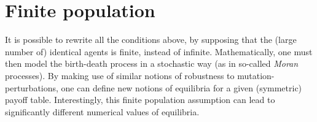 \section{Finite population}
It is possible to rewrite all the conditions above, by supposing that the (large number of) identical agents is finite, instead of infinite.  Mathematically, one must then model the birth-death process in a stochastic way (as in so-called \emph{Moran} processes). By making use of similar notions of robustness to mutation-perturbations, one can define new notions of equilibria for a given (symmetric) payoff table.
Interestingly, this finite population assumption can lead to significantly different numerical values of equilibria.


\ifx \globalmark \undefined %



\else

\fi
